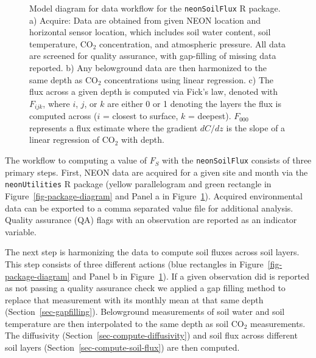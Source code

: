 \documentclass[
  letterpaper,
  DIV=11,
  numbers=noendperiod]{scrartcl}
\begin{document}
\begin{figure}


\caption{\label{fig-model-diagram}Model diagram for data workflow for
the \texttt{neonSoilFlux} R package. a) Acquire: Data are obtained from
given NEON location and horizontal sensor location, which includes soil
water content, soil temperature, CO\(_{2}\) concentration, and
atmospheric pressure. All data are screened for quality assurance, with
gap-filling of missing data reported. b) Any belowground data are then
harmonized to the same depth as CO\(_{2}\) concentrations using linear
regression. c) The flux across a given depth is computed via Fick's law,
denoted with \(F_{ijk}\), where \(i\), \(j\), or \(k\) are either 0 or 1
denoting the layers the flux is computed across (\(i\) = closest to
surface, \(k\) = deepest). \(F_{000}\) represents a flux estimate where
the gradient \(dC/dz\) is the slope of a linear regression of CO\(_{2}\)
with depth.}

\end{figure}%

The workflow to computing a value of \(F_{S}\) with the
\texttt{neonSoilFlux} consists of three primary steps. First, NEON data
are acquired for a given site and month via the \texttt{neonUtilities} R
package (yellow parallelogram and green rectangle in
Figure~\ref{fig-package-diagram} and Panel a in
Figure~\ref{fig-model-diagram}). Acquired environmental data can be
exported to a comma separated value file for additional analysis.
Quality assurance (QA) flags with an observation are reported as an
indicator variable.

The next step is harmonizing the data to compute soil fluxes across soil
layers. This step consists of three different actions (blue rectangles
in Figure~\ref{fig-package-diagram} and Panel b in
Figure~\ref{fig-model-diagram}). If a given observation did is reported
as not passing a quality assurance check we applied a gap filling method
to replace that measurement with its monthly mean at that same depth
(Section~\ref{sec-gapfilling}). Belowground measurements of soil water
and soil temperature are then interpolated to the same depth as soil
CO\(_{2}\) measurements. The diffusivity
(Section~\ref{sec-compute-diffusivity}) and soil flux across different
soil layers (Section~\ref{sec-compute-soil-flux}) are then computed.
\end{document}
